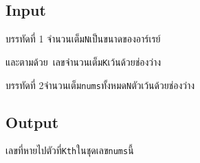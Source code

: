 \documentclass{article}
\begin{document}
\subsection*{Input}
บรรทัดที่ 1 จำนวนเต็ม\texttt{N}เป็นขนาดของอาร์เรย์

และตามด้วย~เลขจำนวนเต็ม\texttt{K}เว้นด้วยช่องว่าง



บรรทัดที่ 2{จำนวนเต็ม}\texttt{nums}{ทั้งหมด}\texttt{N}{ตัวเว้นด้วยช่องว่าง}



\subsection*{Output}
{เลขที่หายไปตัวที่}\texttt{Kth}{ในชุดเลข}\texttt{nums}{นี้}\\
\end{document}
